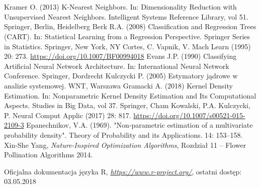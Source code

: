 \documentclass[a4paper,12pt,twoside]{article}
\begin{document}
\newpage
\thispagestyle{empty}
\mbox{}

\newpage
\section*{ }

\renewcommand{\refname}{Bibliografia}
\begin{thebibliography}{}
Kramer O. (2013) K-Nearest Neighbors. In: Dimensionality Reduction with Unsupervised Nearest Neighbors. Intelligent Systems Reference Library, vol 51. Springer, Berlin, Heidelberg
Berk R.A. (2008) Classification and Regression Trees (CART). In: Statistical Learning from a Regression Perspective. Springer Series in Statistics. Springer, New York, NY
Cortes, C. Vapnik, V. Mach Learn (1995) 20: 273. \url{https://doi.org/10.1007/BF00994018}
Evans J.P. (1990) Classifying Artificial Neural Network Architecture. In: International Neural Network Conference. Springer, Dordrecht
Kulczycki P. (2005) Estymatory jądrowe w analizie systemowej. WNT, Warszawa
Gramacki A. (2018) Kernel Density Estimation. In: Nonparametric Kernel Density Estimation and Its Computational Aspects. Studies in Big Data, vol 37. Springer, Cham
Kowalski, P.A. Kulczycki, P. Neural Comput  Applic (2017) 28: 817. \url{https://doi.org/10.1007/s00521-015-2109-3}
Epanechnikov, V.A. (1969). "Non-parametric estimation of a multivariate probability density". Theory of Probability and its Applications. 14: 153–158.
  Xin-She Yang,
  \emph{Nature-Inspired Optimization Algorithms},
  Rozdział 11 – Flower Pollination Algorithms
  2014.

  Oficjalna dokumentacja języka R,
  \emph{\url{https://www.r-project.org/}}, ostatni dostęp: 03.05.2018
  

\end{thebibliography}

\newpage
\section*{ }
\listoffigures
\newpage
{}

\newpage
\end{document}

